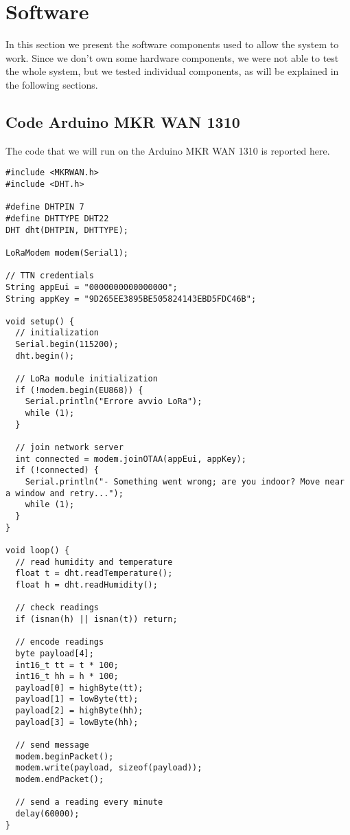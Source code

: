 \section{Software}
\label{sec:software}
In this section we present the software components used to allow the system to work. Since we don't own some hardware components, we were not able to test the whole system, but we tested individual components, as will be explained in the following sections.

\subsection{Code Arduino MKR WAN 1310}
The code that we will run on the Arduino MKR WAN 1310 is reported here.

\begin{lstlisting}[language=Arduino, numbers=none]
#include <MKRWAN.h>
#include <DHT.h>

#define DHTPIN 7
#define DHTTYPE DHT22
DHT dht(DHTPIN, DHTTYPE);

LoRaModem modem(Serial1);

// TTN credentials
String appEui = "0000000000000000";  
String appKey = "9D265EE3895BE505824143EBD5FDC46B";

void setup() {
  // initialization
  Serial.begin(115200);
  dht.begin();
  
  // LoRa module initialization
  if (!modem.begin(EU868)) {
    Serial.println("Errore avvio LoRa"); 
    while (1);
  }
  
  // join network server
  int connected = modem.joinOTAA(appEui, appKey);
  if (!connected) {
    Serial.println("- Something went wrong; are you indoor? Move near a window and retry...");
    while (1);
  }
}

void loop() {
  // read humidity and temperature
  float t = dht.readTemperature();
  float h = dht.readHumidity();
  
  // check readings 
  if (isnan(h) || isnan(t)) return;

  // encode readings
  byte payload[4];
  int16_t tt = t * 100;
  int16_t hh = h * 100;
  payload[0] = highByte(tt);
  payload[1] = lowByte(tt);
  payload[2] = highByte(hh);
  payload[3] = lowByte(hh);

  // send message
  modem.beginPacket();
  modem.write(payload, sizeof(payload));
  modem.endPacket();

  // send a reading every minute 
  delay(60000);
}
\end{lstlisting}


